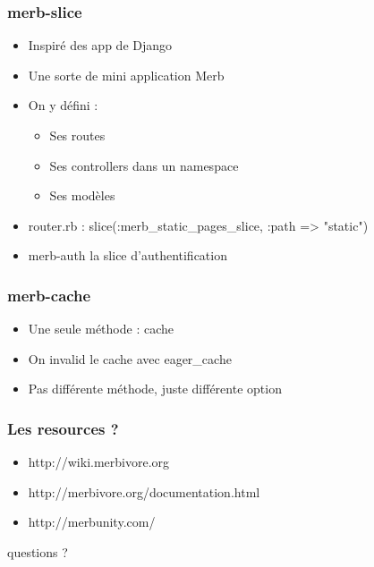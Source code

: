 \documentclass{beamer}
\begin{document}
\begin{frame}
    \frametitle{merb-slice}
    \begin{itemize}
        \item Inspiré des app de Django
        \item Une sorte de mini application Merb
        \item On y défini :
        \begin{itemize}
            \item Ses routes
            \item Ses controllers dans un namespace
            \item Ses modèles
        \end{itemize}
        \item router.rb : slice(:merb\_static\_pages\_slice, :path => "static")
        \item merb-auth la slice d'authentification
    \end{itemize}
\end{frame}

\begin{frame}
    \frametitle{merb-cache}
    \begin{itemize}
        \item Une seule méthode : cache
        \item On invalid le cache avec eager\_cache
        \item Pas différente méthode, juste différente option
    \end{itemize}
\end{frame}

\begin{frame}
    \begin{center}
        
    \end{center}
\end{frame}

\begin{frame}
    \frametitle{Les resources ?}
    \begin{itemize}
        \item http://wiki.merbivore.org
        \item http://merbivore.org/documentation.html
        \item http://merbunity.com/
    \end{itemize}
\end{frame}

\begin{frame}
    \begin{center}
    \huge{}
    questions ?
    \end{center}
\end{frame}
\end{document}
